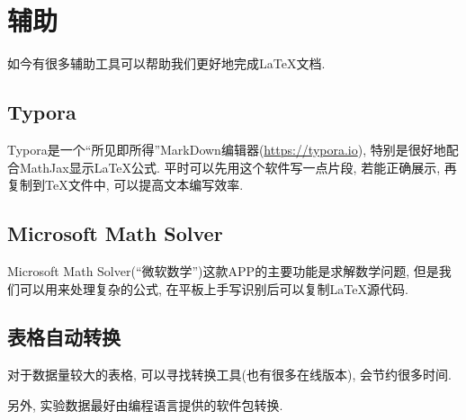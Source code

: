 \chapter{辅助}

如今有很多辅助工具可以帮助我们更好地完成\LaTeX{}文档.

\section{Typora}

Typora是一个``所见即所得''MarkDown编辑器(\url{https://typora.io}), 特别是很好地配合MathJax显示\LaTeX{}公式.
平时可以先用这个软件写一点片段, 若能正确展示, 再复制到\TeX{}文件中, 可以提高文本编写效率.

\section{Microsoft Math Solver}

Microsoft Math Solver(``微软数学'')这款APP的主要功能是求解数学问题, 但是我们可以用来处理复杂的公式, 在平板上手写识别后可以复制\LaTeX{}源代码.

\section{表格自动转换}

对于数据量较大的表格, 可以寻找转换工具(也有很多在线版本), 会节约很多时间.

另外, 实验数据最好由编程语言提供的软件包转换.
